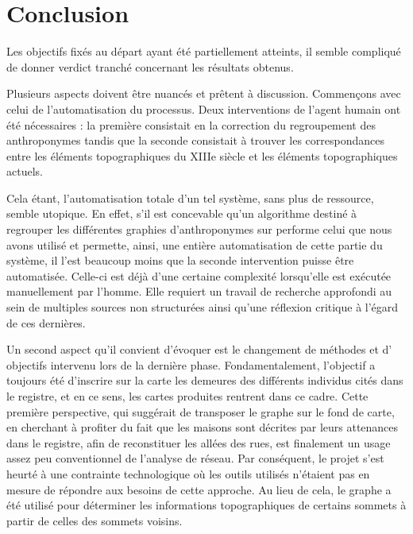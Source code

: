 \section{Conclusion}
Les objectifs fixés au départ ayant été partiellement atteints, il semble compliqué de donner verdict tranché concernant les résultats obtenus. 

Plusieurs aspects doivent être nuancés et prêtent à discussion.
Commençons avec celui de l'automatisation du processus.
Deux interventions de l'agent humain ont été nécessaires : la première consistait en la correction du regroupement des anthroponymes tandis que la seconde consistait à trouver les correspondances entre les éléments topographiques du XIIIe siècle et les éléments topographiques actuels. 

Cela étant, l'automatisation totale d'un tel système, sans plus de ressource, semble utopique. En effet, s'il est concevable qu'un algorithme destiné à regrouper les différentes graphies d'anthroponymes sur performe celui que nous avons utilisé et permette, ainsi, une entière automatisation de cette partie du système, il l'est beaucoup moins que la seconde intervention puisse être automatisée. Celle-ci est déjà d'une certaine complexité lorsqu'elle est exécutée manuellement par l'homme. Elle requiert un travail de recherche approfondi au sein de multiples sources non structurées ainsi qu'une réflexion critique à l'égard de ces dernières.

Un second aspect qu'il convient d'évoquer est le changement de méthodes et d' objectifs intervenu lors de la dernière phase. Fondamentalement, l'objectif a toujours été d’inscrire sur la carte les demeures des différents individus cités dans le registre, et en ce sens, les cartes produites rentrent dans ce cadre. Cette première perspective, qui suggérait de transposer le graphe sur le fond de carte, en cherchant à profiter du fait que les maisons sont décrites par leurs attenances dans le registre, afin de reconstituer les allées des rues, est finalement un usage assez peu conventionnel de l'analyse de réseau. Par conséquent, le projet s'est heurté à une contrainte technologique où les outils utilisés n'étaient pas en mesure de répondre aux besoins de cette approche. Au lieu de cela, le graphe a été utilisé pour déterminer les informations topographiques de certains sommets à partir de celles des sommets voisins. 

